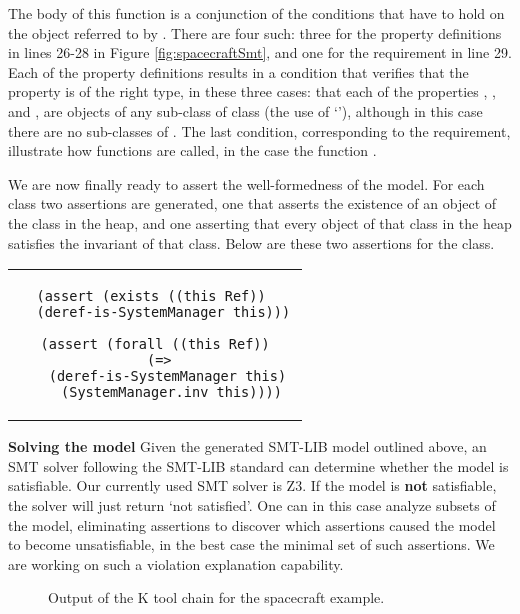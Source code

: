\noindent The body of this function is a conjunction of the conditions
that have to hold on the  object referred to by
. There are four such: three for the property definitions
in lines 26-28 in Figure \ref{fig:spacecraftSmt}, and one for the
requirement in line 29. Each of the property definitions results in a
condition that verifies that the property is of the right type, in
these three cases: that each of the properties ,
, and , are objects of any sub-class
of class  (the use of `'), although in this case
there are no sub-classes of . The last condition,
corresponding to the requirement, illustrate how functions are called,
in the case the function .

We are now finally ready to assert the well-formedness of the
model. For each class two assertions are generated, one that asserts
the existence of an object of the class in the heap, and one asserting
that every object of that class in the heap satisfies the invariant of
that class. Below are these two assertions for the 
class.

\begin{center}
\begin{tabular}{c}
\begin{lstlisting}
(assert (exists ((this Ref)) 
  (deref-is-SystemManager this)))

(assert (forall ((this Ref))
  (=> 
    (deref-is-SystemManager this) 
    (SystemManager.inv this))))
\end{lstlisting}
\end{tabular}
\end{center}

\textbf{Solving the model} Given the generated SMT-LIB model outlined
above, an SMT solver following the SMT-LIB standard can determine
whether the model is satisfiable. Our currently used SMT solver is
Z3. If the model is {\bf not} satisfiable, the solver will just return
`not satisfied'. One can in this case analyze subsets of the model,
eliminating assertions to discover which assertions caused the model
to become unsatisfiable, in the best case the minimal set of such
assertions. We are working on such a violation explanation capability.

\begin{figure}
\caption{Output of the K tool chain for the spacecraft example.}
\label{fig:shapes}
\end{figure}

